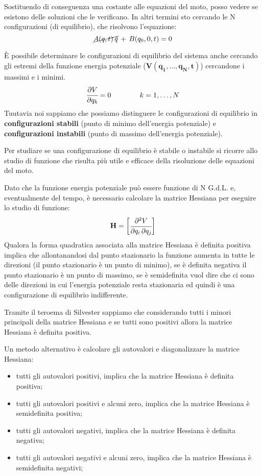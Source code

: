 Sostituendo di conseguenza una costante alle equazioni del moto, posso vedere se esistono delle soluzioni che le verificano. In altri termini sto cercando le N configurazioni (di equilibrio), che risolvono l'equazione:
\[\cancel{A(q,t)\,\ddot{q}}\,+\,B(q_0,0,t) = 0\]

È possibile determinare le configurazioni di equilibrio del sistema anche cercando gli estremi della funzione energia potenziale ($\mathbf{V(q_1,\dots,q_N,t)}$) cercandone i massimi e i minimi.
\[\cfrac{\partial V}{\partial q_k}=0\qquad\qquad k=1,\dots,N\]
Tuutavia noi sappiamo che possiamo distinguere le configurazioni di equilibrio in \textbf{configurazioni stabili} (punto di minimo dell'energia potenziale) e \textbf{configurazioni instabili} (punto di massimo dell'energia potenziale). 

Per studiare se una configurazione di equilibrio è stabile o instabile si ricorre allo studio di funzione che risulta più utile e efficace della risoluzione delle equazioni del moto.

Dato che la funzione energia potenziale può essere funzione di N G.d.L. e, eventualmente del tempo, è necessario calcolare la matrice Hessiana per eseguire lo studio di funzione:
\[\mathbf{H} = \begin{bmatrix}\cfrac{\partial^2{V}}{\partial{q_i}\,\partial{q_j}}\end{bmatrix}\]
Qualora la forma quadratica associata alla matrice Hessiana è definita positiva implica che allontanandosi dal punto stazionario la funzione aumenta in tutte le direzioni (il punto stazionario è un punto di minimo), se è definita negativa il punto stazionario è un punto di massimo, se è semidefinita vuol dire che ci sono delle direzioni in cui l'energia potenziale resta stazionaria ed quindi è una configurazione di equilibrio indifferente.

Tramite il teroema di Silvester sappiamo che considerando tutti i minori principali della matrice Hessiana e se tutti sono positivi allora la matrice Hessiana è definita positiva.

Un metodo alternativo è calcolare gli autovalori e diagonalizzare la matrice Hessiana:
\begin{itemize}
\item tutti gli autovalori positivi, implica che la matrice Hessiana è definita positiva;
\item tutti gli autovalori positivi e alcuni zero, implica che la matrice Hessiana è semidefinita positiva;
\item tutti gli autovalori negativi, implica che la matrice Hessiana è definita negativa;
\item tutti gli autovalori negativi e alcuni zero, implica che la matrice Hessiana è semidefinita negativi;
\end{itemize} 

